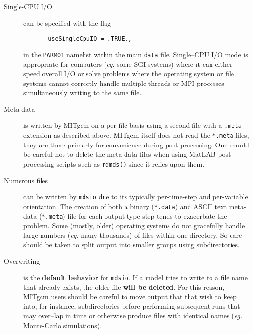 \begin{description}
\item[Single-CPU I/O] can be specified with the flag
\begin{verbatim}
       useSingleCpuIO = .TRUE.,
\end{verbatim}
  in the \texttt{PARM01} namelist within the main \texttt{data} file.
  Single--CPU I/O mode is appropriate for computers (\textit{eg.} some
  SGI systems) where it can either speed overall I/O or solve problems
  where the operating system or file systems cannot correctly handle
  multiple threads or MPI processes simultaneously writing to the same
  file.

\item[Meta-data] is written by MITgcm on a per-file basis using a
  second file with a \texttt{.meta} extension as described above.
  MITgcm itself does not read the \texttt{*.meta} files, they are
  there primarly for convenience during post-processing.  One should
  be careful not to delete the meta-data files when using MatLAB
  post-processing scripts such as \texttt{rdmds()} since it relies
  upon them.

\item[Numerous files] can be written by \texttt{mdsio} due to its
  typically per-time-step and per-variable orientation.  The creation of
  both a binary (\texttt{*.data}) and ASCII text meta-data
  (\texttt{*.meta}) file for each output type step tends to exacerbate
  the problem.  Some (mostly, older) operating systems do not
  gracefully handle large numbers (\textit{eg.} many thousands) of
  files within one directory.  So care should be taken to split output
  into smaller groups using subdirectories.

\item[Overwriting] is the \textbf{default behavior} for
  \texttt{mdsio}.  If a model tries to write to a file name that
  already exists, the older file \textbf{will be deleted}.  For this
  reason, MITgcm users should be careful to move output that that wish
  to keep into, for instance, subdirectories before performing
  subsequent runs that may over--lap in time or otherwise produce
  files with identical names (\textit{eg.} Monte-Carlo simulations).


\end{description}
